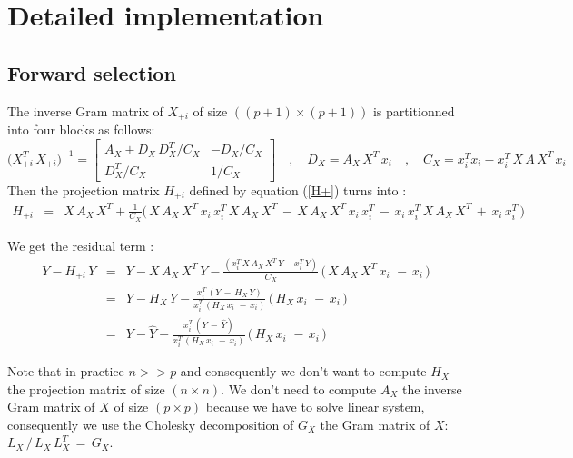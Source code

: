 \newpage
\section{Detailed implementation}
\subsection{Forward selection}

The inverse Gram matrix of $X_{+i}$ of size $((p+1)\times(p+1))$  is partitionned into four blocks as follows:
\begin{equation}
\big(X^T_{+i} \,X_{+i}\big)^{-1} =
 \begin{bmatrix}
A_X + D_X\,D_X^T/C_X  & -D_X/C_X \\
D_X^T/C_X & 1/C_X
\end{bmatrix}
 \quad,\quad D_X = A_X\, X^T\,x_i
 \quad,\quad C_X = x_i^T x_i -x_i^T \,X\,A \, X^T\, x_i
 \end{equation}
Then the projection matrix $H_{+i}$ defined by equation (\ref{H+}) turns into :
 \begin{eqnarray}
H_{+i} & = &X\,A_X \, X^T + \frac{1}{C_X} \big(\,X\,A_X \, X^T\,x_i\,x_i^T\,X\,A_X \, X^T \,-\,X\,A_X \, X^T\,x_i\,x_i^T \,-\,x_i\,x_i^T \, X\,A_X \, X^T\,+\,x_i\,x_i^T \,\big)
\end{eqnarray}

We get the residual term :
 \begin{eqnarray}
Y-H_{+i}\,Y  & = & Y-X\,A_X \, X^T\,Y -\frac{(x_i^T\,X\,A_X \, X^T\,Y-x_i^T\,Y)}{C_X}\, \big(\,X\,A_X \, X^T\,x_i\, \,-\,x_i\,\big)\\
 & = & Y - H_X\,Y -\frac{x_i^T\,(Y\,-\,H_X\,Y)}{x_i^T\,(H_X\,x_i\, \,-\,x_i)}\, \big(\,H_X\,x_i\, \,-\,x_i\,\big)\\
\label{defH+Y}
 & = & Y - \hat{Y} -\frac{x_i^T\,(Y\,-\,\hat{Y})}{x_i^T\,(H_X\,x_i\, \,-\,x_i)}\, \big(\,H_X\,x_i\, \,-\,x_i\,\big)
\end{eqnarray}

Note that in practice $n >> p$ and consequently we don't want to compute $H_X$ the projection matrix of size $(n\times n)$.
We don't need to compute $A_X$ the inverse Gram matrix of $X$ of size $(p\times p)$ because we have to solve linear system, consequently
we use the Cholesky decomposition of $G_X$ the Gram matrix of $X$: $L_X  \,/\, L_X\,L_X^T\,=\,G_X$.

